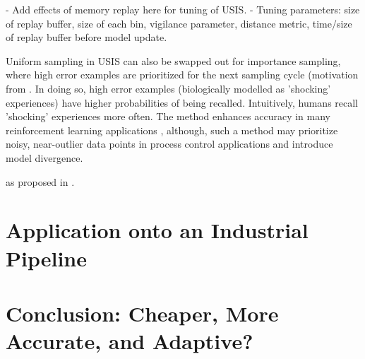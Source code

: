 - Add effects of memory replay here for tuning of USIS.
- Tuning parameters: size of replay buffer, size of each bin, vigilance parameter, distance metric, time/size of replay buffer before model update.

Uniform sampling in USIS can also be swapped out for importance sampling, where high error examples are prioritized for the next sampling cycle (motivation from \cite{prioritize_exp_replay}. In doing so, high error examples (biologically modelled as 'shocking' experiences) have higher probabilities of being recalled.  Intuitively, humans recall 'shocking' experiences more often. The method enhances accuracy in many reinforcement learning applications \cite{dqn, er1, er2}, although, such a method may prioritize noisy, near-outlier data points in process control applications and introduce model divergence.

as proposed in \cite{eff_of_er}.

\section{Application onto an Industrial Pipeline}

\section{Conclusion: Cheaper, More Accurate, and Adaptive?}
